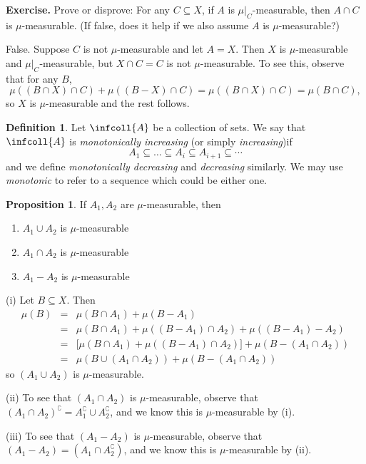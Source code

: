 \documentclass[a5paper]{article}
\makeatletter
\theoremstyle{definition}%
\newtheorem*{proposition*}{Proposition}
\newtheorem*{definition*}{Definition}
\numberwithin{exercise}{section}
\theoremstyle{remark}%
\renewcommand{\measure}[1]{\mu\left(#1\right)}
\newcommand{\mumeasurable}{$\mu$-measurable}
\renewenvironment{proof}{{Proof.}}{\qed}
\renewenvironment{proof}[1][\proofname.]{\par
  \pushQED{\qed}%
  \normalfont \topsep6\p@\@plus6\p@\relax
  \trivlist
  \item[\hskip\labelsep
        \scshape
    #1\@addpunct{}]\ignorespaces
}{%
  \popQED\endtrivlist\@endpefalse
}
\makeatother
\begin{document}
\noindent\textbf{Exercise.} Prove or disprove: For any $C\subseteq X$, if $A$ is $\mu|_C$-measurable, then $A\cap C$ is \mumeasurable{}. (If false, does it help if we also assume $A$ is \mumeasurable{}?)
\begin{proof}
False. Suppose $C$ is not \mumeasurable{} and let $A=X$. Then $X$ is \mumeasurable{} and $\mu|_C$-measurable, but $X\cap C= C$ is not \mumeasurable{}. To see this, observe that for any $B$, 
$$\measure{(B\cap X)\cap C} + \measure{(B-X)\cap C} = \measure{(B\cap X)\cap C} = \measure{B\cap C},$$
so $X$ is \mumeasurable{} and the rest follows.
\end{proof}

\begin{definition*}
Let $\infcoll{A}$ be a collection  of sets. We say that $\infcoll{A}$ is \emph{monotonically increasing} (or simply \emph{increasing})if%
$$A_1 \subseteq \dots \subseteq	 A_i \subseteq A_{i+1} \subseteq \cdots$$
and we define \textit{monotonically decreasing} and \emph{decreasing} similarly. We may use \emph{monotonic} to refer to a sequence which could be either one. 
\end{definition*}

\begin{proposition*}
If $A_1, A_2$ are \mumeasurable{}, then
\begin{enumerate}[label=(\roman*)]
\item $A_1\cup A_2$ is \mumeasurable{}
\item $A_1\cap A_2$ is \mumeasurable{}
\item $A_1- A_2$ is \mumeasurable{}
\end{enumerate}
\end{proposition*}
\begin{proof}(i) Let $B\subseteq X$. Then 
\[\begin{array}{rcl}
\measure{B}&=&\measure{B\cap A_1}+\measure{B-A_1}\\
&=&\measure{B\cap A_1}+\measure{(B-A_1)\cap A_2}+\measure{(B-A_1)- A_2}\\
&=&\big[\measure{B\cap A_1}+\measure{(B-A_1)\cap A_2}\big]+\measure{B-(A_1\cap A_2)}\\
&=&\measure{B\cup (A_1\cap A_2)}+\measure{B-(A_1\cap A_2)}
\end{array}\]
so $(A_1\cup A_2)$ is \mumeasurable{}. \qedwhite

(ii) To see that $(A_1\cap A_2)$ is \mumeasurable{}, observe that $(A_1\cap A_2)^\complement=A_1^\complement\cup A_2^\complement$, and we know this is \mumeasurable{} by (i). \qedwhite

(iii) To see that $(A_1-A_2)$ is \mumeasurable{}, observe that $(A_1-A_2)=(A_1\cap A_2^\complement)$, and we know this is \mumeasurable{} by (ii).
\end{proof}
\end{document}
